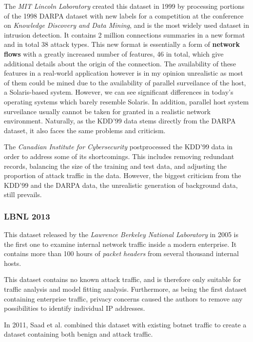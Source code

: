 The \textit{MIT Lincoln Laboratory} created this dataset in 1999 by processing portions of the 1998 DARPA dataset with new labels for a competition at the conference on \textit{Knowledge Discovery and Data Mining}, and is the most widely used dataset in intrusion detection. It contains 2 million connections summaries in a new format and in total 38 attack types. This new format is essentially a form of \textbf{network flows} with a greatly increased number of features, 46 in total, which give additional details about the origin of the connection. The availability of these features in a real-world application however is in my opinion unrealistic as most of them could be mined due to the availability of parallel surveilance of the host, a Solaris-based system. However, we can see significant differences in today's operating systems which barely resemble Solaris. In addition, parallel host system surveilance usually cannot be taken for granted in a realistic network environment. Naturally, as the KDD'99 data stems directly from the DARPA dataset, it also faces the same problems and criticism. 

The \textit{Canadian Institute for Cybersecurity} postprocessed the KDD'99 data in order to address some of its shortcomings. This includes removing redundant records, balancing the size of the training and test data, and adjusting the proportion of attack traffic in the data. However, the biggest criticism from the KDD'99 and the DARPA data, the unrealistic generation of background data, still prevails.

\subsubsection*{LBNL 2013 \cite{pang2005first}}

This dataset released by the \textit{Lawrence Berkeley National Laboratory} in 2005 is the first one to examine internal network traffic inside a modern enterprise. It contains more than 100 hours of \textit{packet headers} from several thousand internal hosts. 

This dataset contains no known attack traffic, and is therefore only suitable for traffic analysis and model fitting analysis. Furthermore, as being the first dataset containing enterprise traffic, privacy concerns caused the authors to remove any possibilities to identify individual IP addresses.

In 2011, Saad et al. \cite{saad2011detecting} combined this dataset with existing botnet traffic to create a dataset containing both benign and attack traffic. 

